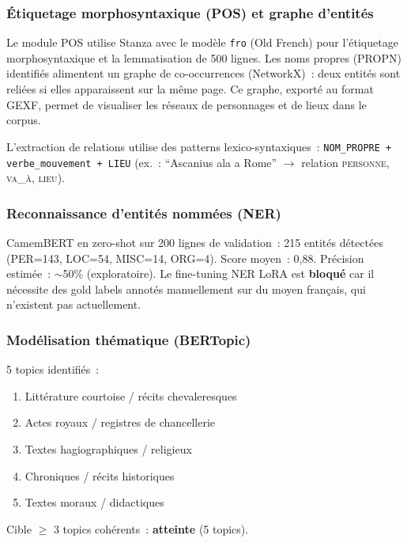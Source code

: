 \documentclass[11pt,a4paper]{article}
\begin{document}
\subsubsection{Étiquetage morphosyntaxique (POS) et graphe d'entités}

Le module POS utilise Stanza avec le modèle \texttt{fro} (Old French) pour l'étiquetage morphosyntaxique et la lemmatisation de 500 lignes. Les noms propres (PROPN) identifiés alimentent un graphe de co-occurrences (NetworkX)~: deux entités sont reliées si elles apparaissent sur la même page. Ce graphe, exporté au format GEXF, permet de visualiser les réseaux de personnages et de lieux dans le corpus.

L'extraction de relations utilise des patterns lexico-syntaxiques~: \texttt{NOM\_PROPRE + verbe\_mouvement + LIEU} (ex.~: ``Ascanius ala a Rome'' $\rightarrow$ relation \textsc{personne, va\_à, lieu}).

\subsubsection{Reconnaissance d'entités nommées (NER)}

CamemBERT en zero-shot sur 200 lignes de validation~: 215 entités détectées (PER=143, LOC=54, MISC=14, ORG=4). Score moyen~: 0,88. Précision estimée~: $\sim$50\% (exploratoire). Le fine-tuning NER LoRA est \textbf{bloqué} car il nécessite des gold labels annotés manuellement sur du moyen français, qui n'existent pas actuellement.

\subsubsection{Modélisation thématique (BERTopic)}

5 topics identifiés~:
\begin{enumerate}[leftmargin=*, itemsep=1pt]
\item Littérature courtoise / récits chevaleresques
\item Actes royaux / registres de chancellerie
\item Textes hagiographiques / religieux
\item Chroniques / récits historiques
\item Textes moraux / didactiques
\end{enumerate}

Cible $\geq$ 3 topics cohérents~: \textbf{atteinte} (5 topics).

\end{document}

